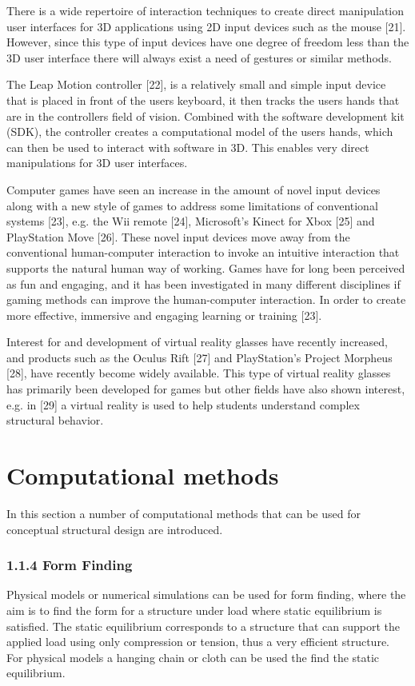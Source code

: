 There is a wide repertoire of interaction techniques to create direct manipulation user interfaces for 3D applications using 2D input devices such as the mouse [21]. However, since this type of input devices have one degree of freedom less than the 3D user interface there will always exist a need of gestures or similar methods. 



The Leap Motion controller [22], is a relatively small and simple input device that is placed in front of the users keyboard, it then tracks the users hands that are in the controllers field of vision. Combined with the software development kit (SDK), the controller creates a computational model of the users hands, which can then be used to interact with software in 3D. This enables very direct manipulations for 3D user interfaces.



Computer games have seen an increase in the amount of novel input devices along with a new style of games to address some limitations of conventional systems [23], e.g. the Wii remote [24], Microsoft’s Kinect for Xbox [25] and PlayStation Move [26]. These novel input devices move away from the conventional human-computer interaction to invoke an intuitive interaction that supports the natural human way of working. Games have for long been perceived as fun and engaging, and it has been investigated in many different disciplines if gaming methods can improve the human-computer interaction. In order to create more effective, immersive and engaging learning or training [23]. 



Interest for and development of virtual reality glasses have recently increased, and products such as the Oculus Rift [27] and PlayStation’s Project Morpheus [28], have recently become widely available. This type of virtual reality glasses has primarily been developed for games but other fields have also shown interest, e.g. in [29] a virtual reality is used to help students understand complex structural behavior.



\section{Computational methods}
In this section a number of computational methods that can be used for conceptual structural design are introduced. 

\subsubsection[1.1.4 Form Finding]{1.1.4 Form Finding}
Physical models or numerical simulations can be used for form finding, where the aim is to find the form for a structure under load where static equilibrium is satisfied. The static equilibrium corresponds to a structure that can support the applied load using only compression or tension, thus a very efficient structure. For physical models a hanging chain or cloth can be used the find the static equilibrium.



